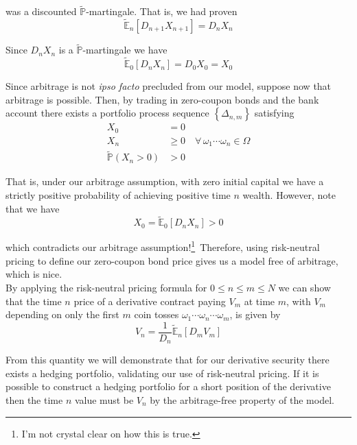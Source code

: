\documentclass[12pt]{article}
\newlength\tindent
\renewcommand{\indent}{\hspace*{\tindent}}
\renewcommand{\P}{\mathbb P}
\newcommand{\E}{\mathbb E}
\begin{document}
was a discounted $\tilde{\P}$-martingale. That is, we had proven
\begin{equation*}
	\tilde{\E}_n \left[ D_{n + 1}X_{n + 1} \right] = D_nX_n
\end{equation*}

Since $D_nX_n$ is a $\tilde{\P}$-martingale we have
\begin{equation*}
	\tilde{\E}_0[D_nX_n] = D_0X_0 = X_0
\end{equation*}

\indent Since arbitrage is not {\em ipso facto} precluded from our model, suppose now that arbitrage is possible. Then, by trading in zero-coupon bonds and the bank account there exists a portfolio process sequence $\left\{\Delta_{n,m}\right\}$ satisfying
\begin{align*}
	X_0 &= 0 \\
	X_n &\geq 0 \quad \forall\,\omega_1\cdots\omega_n\in\Omega \\
	\tilde{\P}(X_n > 0) &> 0
\end{align*}

\indent That is, under our arbitrage assumption, with zero initial capital we have a strictly positive probability of achieving positive time $n$ wealth. However, note that we have
\begin{equation*}
	X_0 = \tilde{\E}_0[D_nX_n] > 0
\end{equation*}

which contradicts our arbitrage assumption!\footnote{I'm not crystal clear on how this is true.}~Therefore, using risk-neutral pricing to define our zero-coupon bond price gives us a model free of arbitrage, which is nice. \\

\indent By applying the risk-neutral pricing formula for $0 \leq n \leq m \leq N$ we can show that the time $n$ price of a derivative contract paying $V_m$ at time $m$, with $V_m$ depending on only the first $m$ coin tosses $\omega_1\cdots\omega_{n}\cdots\omega_m$, is given by
\begin{equation*}
	V_n = \frac{1}{D_n} \tilde{\E}_n[D_mV_m]
\end{equation*}

\indent From this quantity we will demonstrate that for our derivative security there exists a hedging portfolio, validating our use of risk-neutral pricing. If it is possible to construct a hedging portfolio for a short position of the derivative then the time $n$ value must be $V_n$ by the arbitrage-free property of the model. \\
\end{document}
